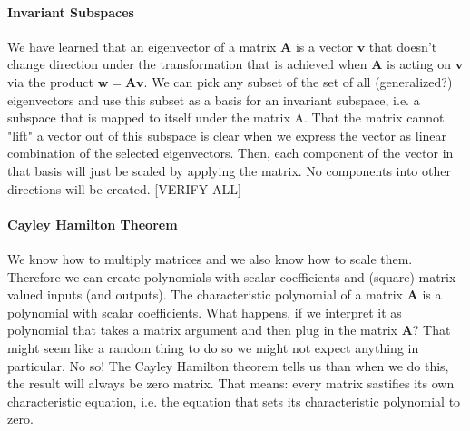 

\paragraph{Invariant Subspaces}
We have learned that an eigenvector of a matrix $\mathbf{A}$ is a vector $\mathbf{v}$ that doesn't change direction under the transformation that is achieved when $\mathbf{A}$ is acting on  $\mathbf{v}$ via the product $\mathbf{w} = \mathbf{A} \mathbf{v}$. We can pick any subset of the set of all (generalized?) eigenvectors and use this subset as a basis for an invariant subspace, i.e. a subspace that is mapped to itself under the matrix A. That the matrix cannot "lift" a vector out of this subspace is clear when we express the vector as linear combination of the selected eigenvectors. Then, each component of the vector in that basis will just be scaled by applying the matrix. No components into other directions will be created. [VERIFY ALL]





\paragraph{Cayley Hamilton Theorem}
We know how to multiply matrices and we also know how to scale them. Therefore we can create polynomials with scalar coefficients and (square) matrix valued inputs (and outputs). The characteristic polynomial of a matrix $\mathbf{A}$ is a polynomial with scalar coefficients. What happens, if we interpret it as polynomial that takes a matrix argument and then plug in the matrix $\mathbf{A}$? That might seem like a random thing to do so we might not expect anything in particular. No so! The Cayley Hamilton theorem tells us than when we do this, the result will always be zero matrix. That means: every matrix sastifies its own characteristic equation, i.e. the equation that sets its characteristic polynomial to zero.

